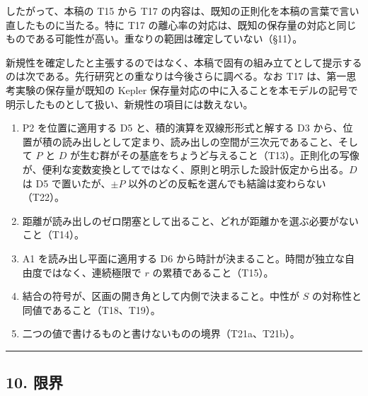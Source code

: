 \documentclass[
  a4paper,
]{ltjsarticle}
\providecommand{\tightlist}{%
  \setlength{\itemsep}{0pt}\setlength{\parskip}{0pt}}
\begin{document}
したがって、本稿の T15 から T17
の内容は、既知の正則化を本稿の言葉で言い直したものに当たる。特に T17
の離心率の対応は、既知の保存量の対応と同じものである可能性が高い。重なりの範囲は確定していない（§11）。

新規性を確定したと主張するのではなく、本稿で固有の組み立てとして提示するのは次である。先行研究との重なりは今後さらに調べる。なお
T17 は、第一思考実験の保存量が既知の Kepler
保存量対応の中に入ることを本モデルの記号で明示したものとして扱い、新規性の項目には数えない。

\begin{enumerate}
\def\labelenumi{\arabic{enumi}.}
\tightlist
\item
  P2 を位置に適用する D5 と、積的演算を双線形形式と解する D3
  から、位置が積の読み出しとして定まり、読み出しの空間が三次元であること、そして
  \(P\) と \(D\)
  が生む群がその基底をちょうど与えること（T13）。正則化の写像が、便利な変数変換としてではなく、原則と明示した設計仮定から出る。\(D\)
  は D5 で置いたが、\(\pm P\)
  以外のどの反転を選んでも結論は変わらない（T22）。
\item
  距離が読み出しのゼロ閉塞として出ること、どれが距離かを選ぶ必要がないこと（T14）。
\item
  A1 を読み出し平面に適用する D6
  から時計が決まること。時間が独立な自由度ではなく、連続極限で \(r\)
  の累積であること（T15）。
\item
  結合の符号が、区画の開き角として内側で決まること。中性が \(S\)
  の対称性と同値であること（T18、T19）。
\item
  二つの値で書けるものと書けないものの境界（T21a、T21b）。
\end{enumerate}

\begin{center}\rule{0.5\linewidth}{0.5pt}\end{center}

\subsection{10. 限界}\label{ux9650ux754c}
\end{document}
